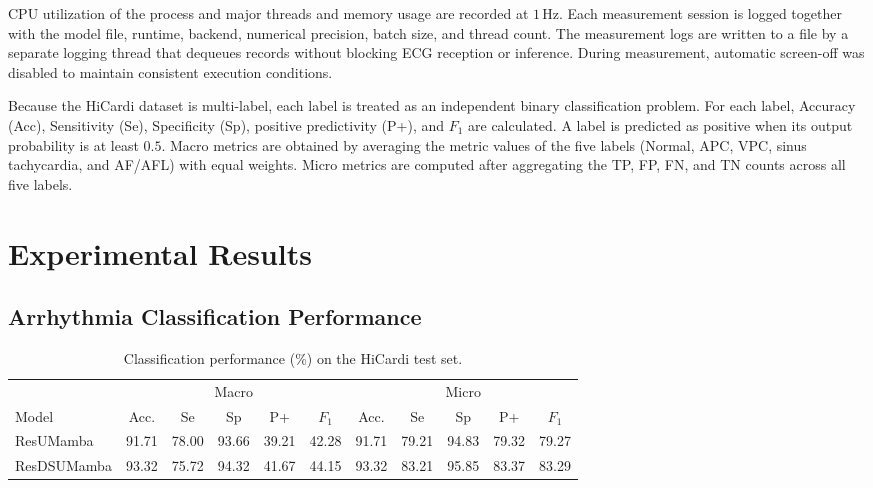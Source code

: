 CPU utilization of the process and major threads and memory usage are recorded at $1\,\mathrm{Hz}$. Each measurement session is logged together with the model file, runtime, backend, numerical precision, batch size, and thread count. The measurement logs are written to a file by a separate logging thread that dequeues records without blocking ECG reception or inference. During measurement, automatic screen-off was disabled to maintain consistent execution conditions.

Because the HiCardi dataset is multi-label, each label is treated as an independent binary classification problem. For each label, Accuracy (Acc), Sensitivity (Se), Specificity (Sp), positive predictivity (P+), and $F_1$ are calculated. A label is predicted as positive when its output probability is at least $0.5$. Macro metrics are obtained by averaging the metric values of the five labels (Normal, APC, VPC, sinus tachycardia, and AF/AFL) with equal weights. Micro metrics are computed after aggregating the TP, FP, FN, and TN counts across all five labels.


\section{Experimental Results}

\subsection{Arrhythmia Classification Performance} 
\label{sec:classification_perf}

\begin{table}[h]
\centering
\caption[Classification performance on the HiCardi test set.]{Classification performance (\%) on the HiCardi test set.}
\label{tab:hicardi_main}
\setlength{\tabcolsep}{4.35pt}
\small
\begin{tabular}{@{}lcccccccccc@{}}
\toprule
& \multicolumn{5}{c}{Macro} & \multicolumn{5}{c}{Micro} \\
\cmidrule(lr){2-6}\cmidrule(lr){7-11}
Model & Acc. & Se & Sp & P+ & $F_1$ & Acc. & Se & Sp & P+ & $F_1$ \\
\midrule
ResUMamba & 91.71 & 78.00 & 93.66 & 39.21 & 42.28 & 91.71 & 79.21 & 94.83 & 79.32 & 79.27 \\
ResDSUMamba & 93.32 & 75.72 & 94.32 & 41.67 & 44.15 & 93.32 & 83.21 & 95.85 & 83.37 & 83.29 \\
\bottomrule
\end{tabular}
\end{table}

